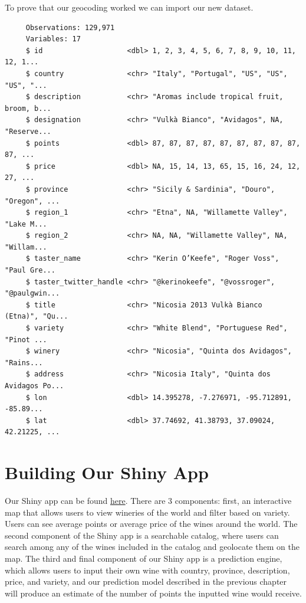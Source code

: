 \documentclass[12pt,twoside]{amherstthesis}
\newenvironment{Shaded}{\begin{snugshade}}{\end{snugshade}}
\newcommand{\KeywordTok}[1]{\textcolor[rgb]{0.13,0.29,0.53}{\textbf{#1}}}
\newcommand{\StringTok}[1]{\textcolor[rgb]{0.31,0.60,0.02}{#1}}
\newcommand{\OperatorTok}[1]{\textcolor[rgb]{0.81,0.36,0.00}{\textbf{#1}}}
\newcommand{\NormalTok}[1]{#1}
\begin{document}
To prove that our geocoding worked we can import our new dataset.
\begin{Shaded}
\end{Shaded}
\begin{verbatim}
     Observations: 129,971
     Variables: 17
     $ id                    <dbl> 1, 2, 3, 4, 5, 6, 7, 8, 9, 10, 11, 12, 1...
     $ country               <chr> "Italy", "Portugal", "US", "US", "US", "...
     $ description           <chr> "Aromas include tropical fruit, broom, b...
     $ designation           <chr> "Vulkà Bianco", "Avidagos", NA, "Reserve...
     $ points                <dbl> 87, 87, 87, 87, 87, 87, 87, 87, 87, 87, ...
     $ price                 <dbl> NA, 15, 14, 13, 65, 15, 16, 24, 12, 27, ...
     $ province              <chr> "Sicily & Sardinia", "Douro", "Oregon", ...
     $ region_1              <chr> "Etna", NA, "Willamette Valley", "Lake M...
     $ region_2              <chr> NA, NA, "Willamette Valley", NA, "Willam...
     $ taster_name           <chr> "Kerin O’Keefe", "Roger Voss", "Paul Gre...
     $ taster_twitter_handle <chr> "@kerinokeefe", "@vossroger", "@paulgwin...
     $ title                 <chr> "Nicosia 2013 Vulkà Bianco  (Etna)", "Qu...
     $ variety               <chr> "White Blend", "Portuguese Red", "Pinot ...
     $ winery                <chr> "Nicosia", "Quinta dos Avidagos", "Rains...
     $ address               <chr> "Nicosia Italy", "Quinta dos Avidagos Po...
     $ lon                   <dbl> 14.395278, -7.276971, -95.712891, -85.89...
     $ lat                   <dbl> 37.74692, 41.38793, 37.09024, 42.21225, ...
\end{verbatim}
\section{Building Our Shiny App}\label{building-our-shiny-app}

Our Shiny app can be found
\href{https://szablah.shinyapps.io/wine/}{here}. There are 3 components:
first, an interactive map that allows users to view wineries of the
world and filter based on variety. Users can see average points or
average price of the wines around the world. The second component of the
Shiny app is a searchable catalog, where users can search among any of
the wines included in the catalog and geolocate them on the map. The
third and final component of our Shiny app is a prediction engine, which
allows users to input their own wine with country, province,
description, price, and variety, and our prediction model described in
the previous chapter will produce an estimate of the number of points
the inputted wine would receive.
\end{document}

